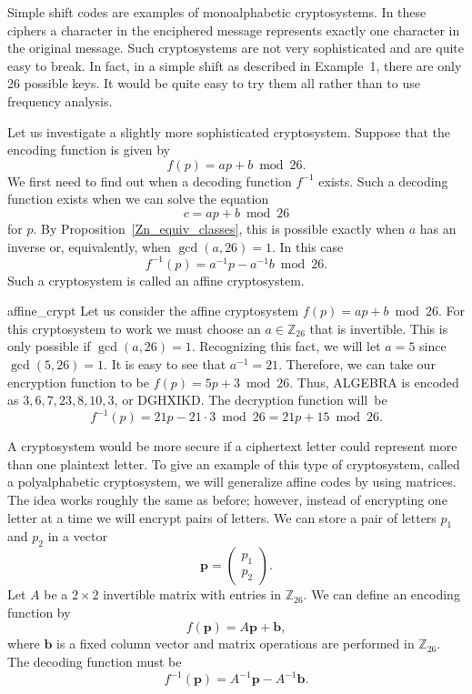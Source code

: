  
Simple shift codes are examples of {\bfi monoalphabetic
cryptosystems}. In these ciphers a
character in the enciphered message represents exactly one character
in the original message. Such cryptosystems are not very sophisticated
and are quite easy to break. In fact, in a simple shift as described
in Example~1, there are only 26 possible keys. It would be quite easy
to try them all rather than to use frequency analysis. 
 
 
Let us investigate a slightly more sophisticated cryptosystem. Suppose
that the encoding function is given by  
\[
f(p) = ap + b \bmod 26.
\]
We first need to find out when a decoding function $f^{-1}$ exists.
Such a decoding function exists when we can solve the equation
\[
c = ap + b \bmod 26
\]
for $p$. By Proposition~\ref{Zn_equiv_classes}, this is possible exactly when $a$ has an
inverse or, equivalently, when $\gcd( a, 26) =1$. In this case 
\[
f^{-1}(p) = a^{-1} p - a^{-1} b \bmod 26.
\]
Such a cryptosystem is called an {\bfi affine
cryptosystem}. 
 
 
\begin{example}{affine_crypt}
Let us consider the affine cryptosystem $f(p) = ap + b \bmod 26$. For
this cryptosystem to work we must choose an $a \in {\mathbb Z}_{26}$
that is invertible. This is only possible if $\gcd(a, 26) = 1$.
Recognizing this fact, we will let $a = 5$ since $\gcd(5, 26) = 1$. It
is easy to see that $a^{-1} = 21$. Therefore, we can take our
encryption function to be $f(p) = 5p + 3 \bmod 26$. Thus, ALGEBRA is
encoded as $3, 6, 7, 23, 8, 10, 3$, or DGHXIKD. The decryption
function will~be   
\[
f^{-1}(p) = 21 p - 21 \cdot 3 \bmod 26 = 21 p + 15 \bmod 26.
\]
\end{example} 
 
A cryptosystem would be more secure if a ciphertext letter could
represent more than one plaintext letter.  To give an example of this
type of cryptosystem, called a {\bfi polyalphabetic
cryptosystem}, we will generalize
affine codes by using matrices. The idea works roughly the same as
before; however, instead of encrypting one letter at a time we will
encrypt pairs of letters.  We can store a pair of letters $p_1$ and
$p_2$ in a vector  
\[
{\mathbf p} = 
\begin{pmatrix}
p_1 \\ p_2
\end{pmatrix}.
\]
Let $A$ be a $2 \times 2$ invertible matrix
with entries in ${\mathbb Z}_{26}$. We can define an encoding function by
\[
f({\mathbf p}) = A {\mathbf p} + {\mathbf b} ,
\]
where ${\mathbf b}$ is a fixed column vector and matrix operations are
performed in ${\mathbb Z}_{26}$. The decoding function must be
\[
f^{-1}({\mathbf p}) = A^{-1} {\mathbf p} - A^{-1} {\mathbf b}.
\]
 
